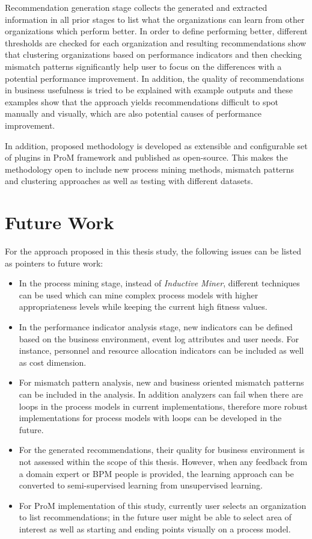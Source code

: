 Recommendation generation stage collects the generated and extracted information in all prior stages to list what the organizations can learn from other organizations which perform better. In order to define performing better, different thresholds are checked for each organization and resulting recommendations show that clustering organizations based on performance indicators and then checking mismatch patterns significantly help user to focus on the differences with a potential performance improvement. In addition, the quality of recommendations in business usefulness is tried to be explained with example outputs and these examples show that the approach yields recommendations difficult to spot manually and visually, which are also potential causes of performance improvement.

In addition, proposed methodology is developed as extensible and configurable set of plugins in ProM framework \cite{verbeek2010prom} and published as open-source. This makes the methodology open to include new process mining methods, mismatch patterns and clustering approaches as well as testing with different datasets.

\section{Future Work}

For the approach proposed in this thesis study, the following issues can be listed as pointers to future work:
\begin{itemize}
	\item In the process mining stage, instead of \textit{Inductive Miner}, different techniques can be used which can mine complex process models with higher appropriateness levels while keeping the current high fitness values.
	\item In the performance indicator analysis stage, new indicators can be defined based on the business environment, event log attributes and user needs. For instance, personnel and resource allocation indicators can be included as well as cost dimension.
	\item For mismatch pattern analysis, new and business oriented mismatch patterns can be included in the analysis. In addition analyzers can fail when there are loops in the process models in current implementations, therefore more robust implementations for process models with loops can be developed in the future.
	\item For the generated recommendations, their quality for business environment is not assessed within the scope of this thesis. However, when any feedback from a domain expert or BPM people is provided, the learning approach can be converted to semi-supervised learning from unsupervised learning.
	\item For ProM implementation of this study, currently user selects an organization to list recommendations; in the future user might be able to select area of interest as well as starting and ending points visually on a process model. 
\end{itemize}